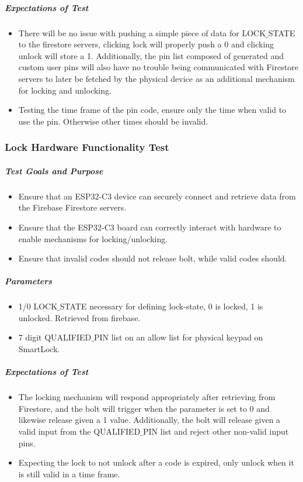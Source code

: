 \documentclass[a4paper,12pt]{article}
\begin{document}
\subparagraph{Expectations of Test}
\begin{itemize}
    \item There will be no issue with pushing a simple piece of data for LOCK$\_$STATE to the firestore servers, clicking lock will properly push a 0 and clicking unlock will store a 1. Additionally, the pin list composed of generated and custom user pins will also have no trouble being communicated with Firestore servers to later be fetched by the physical device as an additional mechanism for locking and unlocking.
    \item Testing the time frame of the pin code, ensure only the time when valid to use the pin. Otherwise other times should be invalid.
\end{itemize}

\subsubsection{Lock Hardware Functionality Test}
\subparagraph{Test Goals and Purpose}
\begin{itemize}
    \item Ensure that an ESP32-C3 device can securely connect and retrieve data from the Firebase Firestore servers.
    \item Ensure that the ESP32-C3 board can correctly interact with hardware to enable mechanisms for locking/unlocking.
    \item Ensure that invalid codes should not release bolt, while valid codes should.
\end{itemize}


\subparagraph{Parameters}
\begin{itemize}
    \item 1/0 LOCK$\_$STATE necessary for defining lock-state, 0 is locked, 1 is unlocked. Retrieved from firebase.
    \item 7 digit QUALIFIED$\_$PIN list on an allow list for physical keypad on SmartLock.
\end{itemize}

\subparagraph{Expectations of Test}
\begin{itemize}
    \item The locking mechanism will respond appropriately after retrieving from Firestore, and the bolt will trigger when the parameter is set to 0 and likewise release given a 1 value. Additionally, the bolt will release given a valid input from the QUALIFIED$\_$PIN list and reject other non-valid input pins.
    \item Expecting the lock to not unlock after a code is expired, only unlock when it is still valid in a time frame.
\end{itemize}
\end{document}
